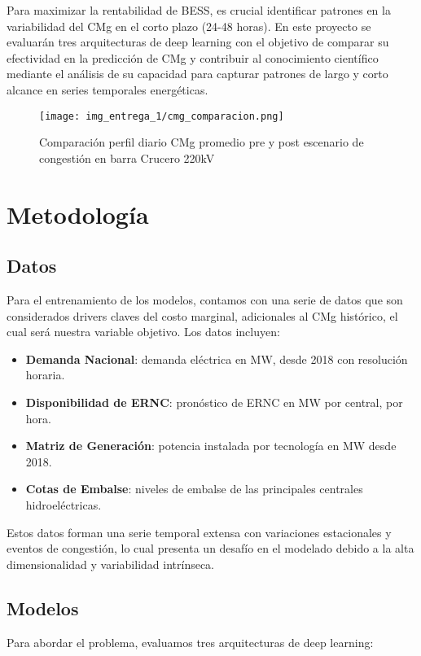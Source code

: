 \documentclass[11pt, twocolumn]{article}
\begin{document}
Para maximizar la rentabilidad de BESS, es crucial identificar patrones en la variabilidad del CMg en el corto plazo (24-48 horas). En este proyecto se evaluarán tres arquitecturas de deep learning con el objetivo de comparar su efectividad en la predicción de CMg y contribuir al conocimiento científico mediante el análisis de su capacidad para capturar patrones de largo y corto alcance en series temporales energéticas.

\begin{figure}[!b]
    \centering
    \texttt{[image: img\_entrega\_1/cmg\_comparacion.png]}
    \caption{Comparación perfil diario CMg promedio pre y post escenario de congestión en barra Crucero 220kV}
    \label{fig:cmg_comparacion}
\end{figure}

\section{Metodología}
\subsection{Datos}
Para el entrenamiento de los modelos, contamos con una serie de datos que son considerados drivers claves del costo marginal, adicionales al CMg histórico, el cual será nuestra variable objetivo. Los datos incluyen:

\begin{itemize}
    \item \textbf{Demanda Nacional}: demanda eléctrica en MW, desde 2018 con resolución horaria.
    \item \textbf{Disponibilidad de ERNC}: pronóstico de ERNC en MW por central, por hora.
    \item \textbf{Matriz de Generación}: potencia instalada por tecnología en MW desde 2018.
    \item \textbf{Cotas de Embalse}: niveles de embalse de las principales centrales hidroeléctricas.
\end{itemize}

Estos datos forman una serie temporal extensa con variaciones estacionales y eventos de congestión, lo cual presenta un desafío en el modelado debido a la alta dimensionalidad y variabilidad intrínseca.

\subsection{Modelos}
Para abordar el problema, evaluamos tres arquitecturas de deep learning:
\end{document}
